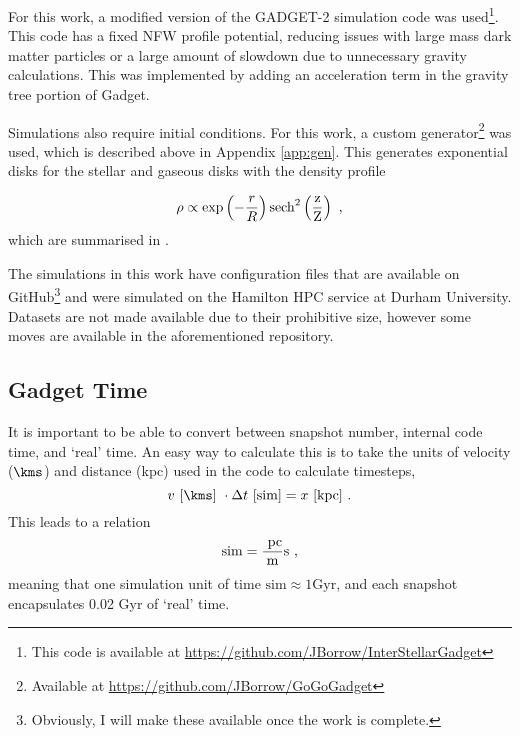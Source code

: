 For this work, a modified version of the GADGET-2 simulation code \citep{springel_cosmological_2005} was
used\footnote{This code is available at
  \url{https://github.com/JBorrow/InterStellarGadget}}. This code has a fixed
NFW profile potential, reducing issues with large mass dark matter
particles or a large amount of slowdown due to unnecessary gravity
calculations. This was implemented by adding an acceleration term in the
gravity tree portion of Gadget.

Simulations also require initial conditions. For this work, a custom
generator\footnote{Available at \url{https://github.com/JBorrow/GoGoGadget}}
was used, which is described above in Appendix \ref{app:gen}. This generates exponential disks for the stellar and gaseous
disks with the density profile

\begin{equation}
\rho \propto \exp\left(-\frac{r}{R}\right)\rm{sech}^2\left(\frac{z}{Z}\right)~,
\end{equation}
which are summarised in \citet{ferriere_interstellar_2001}.

The simulations in this work have configuration files that are
available on GitHub\footnote{Obviously, I will make these available once the work is complete.} and were simulated on the
Hamilton HPC service at Durham University. Datasets are not made
available due to their prohibitive size, however some moves are
available in the aforementioned repository.

\subsection{Gadget Time}
\label{app:gadgettime}

It is important to be able to convert between snapshot number, internal code time, and `real' time.
An easy way to calculate this is to take the units of velocity ($\kms$) and distance (kpc) used in the code to calculate timesteps,
$$
    v ~ [\kms] ~ \cdot \Delta t ~ [\mathrm{sim}] = x ~ [\mathrm{kpc}]~.
$$
This leads to a relation
$$
    \mathrm{sim} = \frac{~\mathrm{pc}}{\mathrm{m}} \mathrm{s}~,
$$
meaning that one simulation unit of time $\mathrm{sim} \approx 1 \mathrm{Gyr}$, and each snapshot encapsulates 0.02 Gyr of `real' time.
